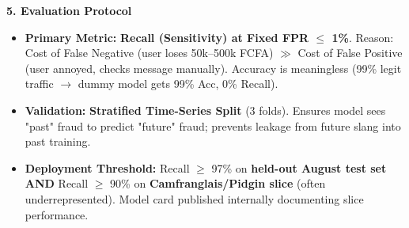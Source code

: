 \documentclass[11pt]{article}
\begin{document}
\begin{exemplebox}
\textbf{5. Evaluation Protocol}
\begin{itemize}
    \item \textbf{Primary Metric:} \textbf{Recall (Sensitivity) at Fixed FPR $\le$ 1\%}. Reason: Cost of False Negative (user loses 50k--500k FCFA) $\gg$ Cost of False Positive (user annoyed, checks message manually). Accuracy is meaningless (99\% legit traffic $\rightarrow$ dummy model gets 99\% Acc, 0\% Recall).
    \item \textbf{Validation:} \textbf{Stratified Time-Series Split} (3 folds). Ensures model sees "past" fraud to predict "future" fraud; prevents leakage from future slang into past training.
    \item \textbf{Deployment Threshold:} Recall $\ge$ 97\% on \textbf{held-out August test set} \textbf{AND} Recall $\ge$ 90\% on \textbf{Camfranglais/Pidgin slice} (often underrepresented). Model card published internally documenting slice performance.
\end{itemize}


\end{exemplebox}
\end{document}
